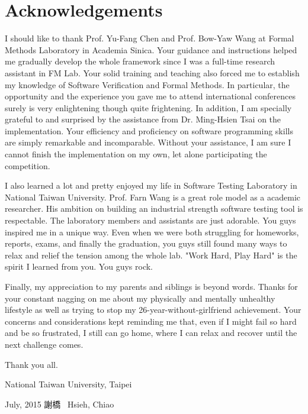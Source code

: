 
\chapter{Acknowledgements}
I should like to thank Prof. Yu-Fang Chen and Prof. Bow-Yaw Wang at Formal
Methods Laboratory in Academia Sinica.
Your guidance and instructions helped me gradually develop the whole framework
since I was a full-time research assistant in FM Lab.
Your solid training and teaching also forced me to establish my knowledge of
Software Verification and Formal Methods.
In particular, the opportunity and the experience you gave me to attend
international conferences surely is very enlightening though quite frightening.
In addition, I am specially grateful to and surprised by the assistance from
Dr. Ming-Hsien Tsai on the implementation.
Your efficiency and proficiency on software programming skills are simply
remarkable and incomparable.
Without your assistance, I am sure I cannot finish the implementation on my own,
let alone participating the competition.

I also learned a lot and pretty enjoyed my life in Software Testing Laboratory
in National Taiwan University.
Prof. Farn Wang is a great role model as a academic researcher.
His ambition on building an industrial strength software testing tool is
respectable.
The laboratory members and assistants are just adorable.
You guys inspired me in a unique way.
Even when we were both struggling for homeworks, reports, exams, and finally
the graduation, you guys still found many ways to relax and relief the tension
among the whole lab.
"Work Hard, Play Hard" is the spirit I learned from you.
You guys rock.

Finally, my appreciation to my parents and siblings is beyond words.
Thanks for your constant nagging on me about my physically and mentally
unhealthy lifestyle as well as trying to stop my 26-year-without-girlfriend
achievement.
Your concerns and considerations kept reminding me that,
even if I might fail so hard and be so frustrated, I still can go home,
where I can relax and recover until the next challenge comes.

\vspace{8mm}

\noindent
Thank you all.

\vspace{8mm}

\noindent
National Taiwan University, Taipei

\noindent
July, 2015 \hfill 謝橋 \ Hsieh, Chiao

